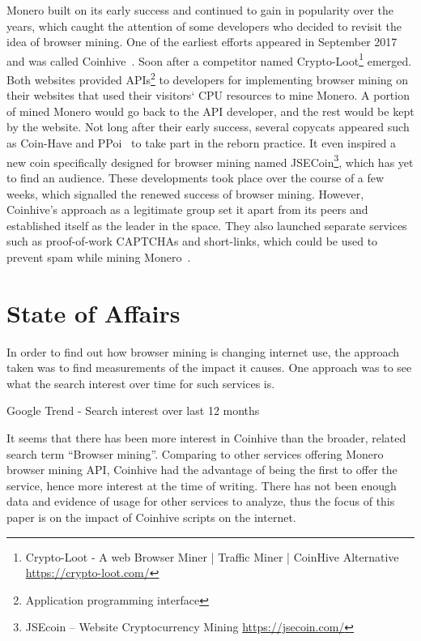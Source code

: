 Monero built on its early success and continued to gain in popularity over the years, which caught the attention of some developers who decided to revisit the idea of browser mining. One of the earliest efforts appeared in September 2017 and was called Coinhive~\cite{coinhive}. Soon after a competitor named Crypto-Loot\footnote{Crypto-Loot - A web Browser Miner | Traffic Miner | CoinHive Alternative \url{https://crypto-loot.com/}} emerged. Both websites provided APIs\footnote{Application programming interface} to developers for implementing browser mining on their websites that used their visitors` CPU resources to mine Monero. A portion of mined Monero would go back to the API developer, and the rest would be kept by the website. Not long after their early success, several copycats appeared such as Coin-Have and PPoi~\cite{coinhivecopycats} to take part in the reborn practice. It even inspired a new coin specifically designed for browser mining named JSECoin\footnote{JSEcoin – Website Cryptocurrency Mining \url{https://jsecoin.com/}}, which has yet to find an audience. These developments took place over the course of a few weeks, which signalled the renewed success of browser mining. However, Coinhive's approach as a legitimate group set it apart from its peers and established itself as the leader in the space. They also launched separate services such as proof-of-work CAPTCHAs and short-links, which could be used to prevent spam while mining Monero~\cite{coinhive}.
\section{State of Affairs}
In order to find out how browser mining is changing internet use, the approach taken was to find measurements of the impact it causes. One approach was to see what the search interest over time for such services is. 

\begin{center}
	\caption{Google Trend - Search interest over last 12 months}
\end{center}

It seems that there has been more interest in Coinhive than the broader, related search term ``Browser mining''. Comparing to other services offering Monero browser mining API, Coinhive had the advantage of being the first to offer the service, hence more interest at the time of writing. There has not been enough data and evidence of usage for other services to analyze, thus the focus of this paper is on the impact of Coinhive scripts on the internet. 

